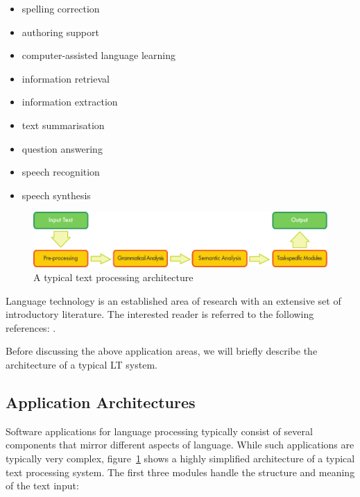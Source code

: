 \begin{multicols}{2}
\begin{itemize}
\item spelling correction
\item authoring support
\item computer-assisted language learning
\item information retrieval 
\item information extraction
\item text summarisation
\item question answering
\item speech recognition 
\item speech synthesis 
\end{itemize}

\begin{figure}[b]
  \center
  \includegraphics[width=\textwidth]{../_media/english/text_processing_app_architecture}
  \caption{A typical text processing architecture}
\label{fig:textprocessingarch_en}
\end{figure}

Language technology is an established area of research with an extensive set of introductory literature. The interested reader is referred to the following references:  \cite{jurafsky-martin01, manning-schuetze1, lt-world1, lt-survey1}.

Before discussing the above application areas, we will briefly describe the architecture of a typical LT system.

\subsection{Application Architectures}

Software applications for language processing typically consist of several components that mirror different aspects of language. While such applications are typically very complex, figure~\ref{fig:textprocessingarch_en} shows a highly simplified architecture of a typical text processing system. The first three modules handle the structure and meaning of the text input:


\end{multicols}
